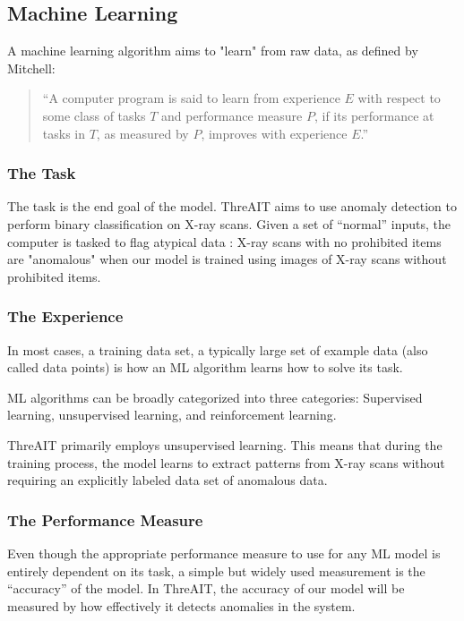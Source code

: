 \documentclass{article}
\begin{document}
\subsection{Machine Learning}
A machine learning algorithm aims to "learn" from raw data, as defined by Mitchell:

\begin{quote}
    “A computer program is said to learn from experience \(E\) with respect to some class of tasks \(T\) and performance measure \(P\), if its performance at tasks in \(T\), as measured by \(P\), improves with experience \(E\).” \cite{mitchell_machine_learning_book}
\end{quote}

\subsubsection{The Task}

The task is the end goal of the model. ThreAIT aims to use anomaly detection to perform binary classification on X-ray scans. Given a set of “normal” inputs, the computer is tasked to flag atypical data \cite{goodfellow_book}: X-ray scans with no prohibited items are "anomalous" when our model is trained using images of X-ray scans without prohibited items.

\subsubsection{The Experience}

In most cases, a training data set, a typically large set of example data (also called data points) is how an ML algorithm learns how to solve its task.

ML algorithms can be broadly categorized into three categories: Supervised learning, unsupervised learning, and reinforcement learning.

ThreAIT primarily employs unsupervised learning. This means that during the training process, the model learns to extract patterns from X-ray scans without requiring an explicitly labeled data set of anomalous data.

\subsubsection{The Performance Measure}
Even though the appropriate performance measure to use for any ML model is entirely dependent on its task, a simple but widely used measurement is the “accuracy” of the model. In ThreAIT, the accuracy of our model will be measured by how effectively it detects anomalies in the system.
\end{document}
